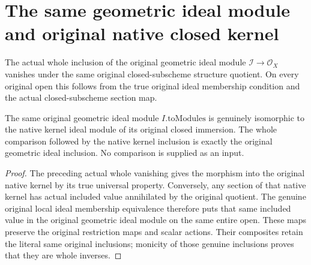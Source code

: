\section{The same geometric ideal module and original native closed kernel}

\begin{theorem}
\label{thm:fc-geometric-ideal-quotient-zero}
\leanok
{}
The actual whole inclusion of the original geometric ideal module
$\mathcal I\to\mathcal O_X$ vanishes under the same original closed-subscheme
structure quotient. On every original open this follows from the true
original ideal membership condition and the actual closed-subscheme section map.
\end{theorem}

\begin{theorem}
\label{thm:fc-geometric-ideal-native-kernel-module}
\leanok
{}
The same original geometric ideal module $I.\mathrm{toModules}$ is genuinely
isomorphic to the native kernel ideal module of its original closed immersion.
The whole comparison followed by the native kernel inclusion is exactly the
original geometric ideal inclusion. No comparison is supplied as an input.
\end{theorem}
\begin{proof}
The preceding actual whole vanishing gives the morphism into the original
native kernel by its true universal property. Conversely, any section of
that native kernel has actual included value annihilated by the original
quotient. The genuine original local ideal membership equivalence therefore
puts that same included value in the original geometric ideal module on the
same entire open. These maps preserve the original restriction maps and
scalar actions. Their composites retain the literal same original inclusions;
monicity of those genuine inclusions proves that they are whole inverses.
\end{proof}
